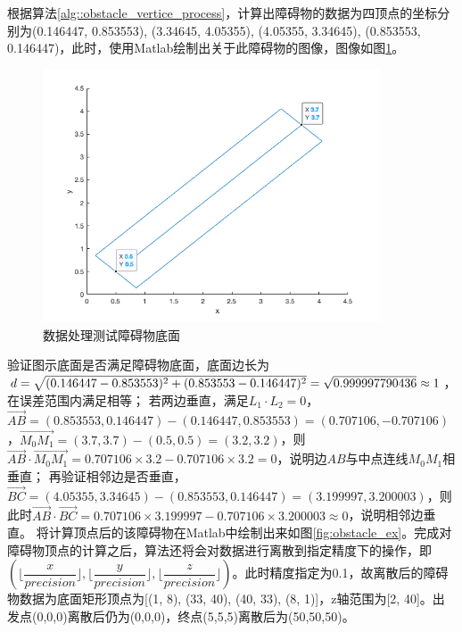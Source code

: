 根据算法\ref{alg::obstacle_vertice_process}，计算出障碍物的数据为四顶点的坐标分别为(0.146447, 0.853553), (3.34645, 4.05355), (4.05355, 3.34645), (0.853553, 0.146447)，此时，使用Matlab绘制出关于此障碍物的图像，图像如图\ref{fig:obstacle_ex_bottom}。
\begin{figure}[!htb]
    \centering
    \includegraphics[width=10cm]{figures/obstacle_ex_bottom.png}
    \caption{数据处理测试障碍物底面}
    \label{fig:obstacle_ex_bottom}
\end{figure}
\par 验证图示底面是否满足障碍物底面，底面边长为$d=\\\sqrt{(0.146447-0.853553)^2+(0.853553-0.146447)^2}=\sqrt{0.999997790436}\approx 1$，在误差范围内满足相等；
若两边垂直，满足$L_1\cdot L_2=0$，$\vec{AB}=(0.853553, 0.146447)-(0.146447, 0.853553)=(0.707106,-0.707106)$，$\vec{M_0M_1}=(3.7,3.7)-(0.5,0.5)=(3.2,3.2)$，则$\vec{AB}\cdot\vec{M_0M_1}=0.707106\times3.2-0.707106\times3.2=0$，说明边$AB$与中点连线$M_0M_1$相垂直；
再验证相邻边是否垂直，$\vec{BC}=(4.05355, 3.34645)-(0.853553, 0.146447)=(3.199997,3.200003)$，则此时$\vec{AB}\cdot\vec{BC}=0.707106\times3.199997-0.707106\times3.200003\approx0$，说明相邻边垂直。
将计算顶点后的该障碍物在Matlab中绘制出来如图\ref{fig:obstacle_ex}。完成对障碍物顶点的计算之后，算法还将会对数据进行离散到指定精度下的操作，即$(\lfloor\dfrac{x}{precision}\rfloor,\lfloor\dfrac{y}{precision}\rfloor,\lfloor\dfrac{z}{precision}\rfloor)$。此时精度指定为0.1，故离散后的障碍物数据为底面矩形顶点为[(1, 8), (33, 40), (40, 33), (8, 1)]，z轴范围为[2, 40]。出发点(0,0,0)离散后仍为(0,0,0)，终点(5,5,5)离散后为(50,50,50)。
